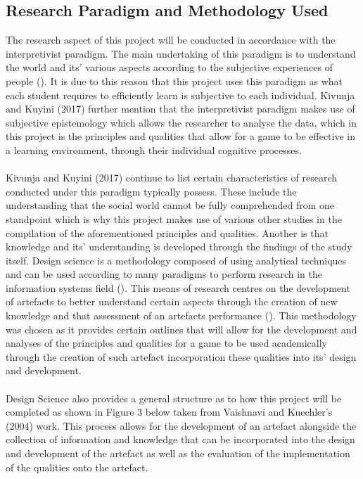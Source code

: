 \subsection{Research Paradigm and Methodology Used}
The research aspect of this project will be conducted in accordance with the interpretivist paradigm. The main undertaking of this paradigm is to understand the world and its’ various aspects according to the subjective experiences of people (\cite{kivunja2017understanding}). It is due to this reason that this project uses this paradigm as what each student requires to efficiently learn is subjective to each individual. Kivunja and Kuyini  (2017) further mention that the interpretivist paradigm makes use of subjective epistemology which allows the researcher to analyse the data, which in this project is the principles and qualities that allow for a game to be effective in a learning environment, through their individual cognitive processes. 
\\\\
Kivunja and Kuyini (2017) continue to list certain characteristics of research conducted under this paradigm typically possess. These include the understanding that the social world cannot be fully comprehended from one standpoint which is why this project makes use of various other studies in the compilation of the aforementioned principles and qualities. Another is that knowledge and its’ understanding is developed through the findings of the study itself.
\pagebreak
Design science is a methodology composed of using analytical techniques and can be used according to many paradigms to perform research in the information systems field (\cite{vaishnavi2004design}). This means of research centres on the development of artefacts to better understand certain aspects through the creation of new knowledge and that assessment of an artefacts performance (\cite{vaishnavi2004design}). This methodology was chosen as it provides certain outlines that will allow for the development and analyses of the principles and qualities for a game to be used academically through the creation of such artefact incorporation these qualities into its’ design and development. 
\\\\
Design Science also provides a general structure as to how this project will be completed as shown in Figure 3 below taken from Vaishnavi and Kuechler’s (2004) work. This process allows for the development of an artefact alongside the collection of information and knowledge that can be incorporated into the design and development of the artefact as well as the evaluation of the implementation of the qualities onto the artefact.

